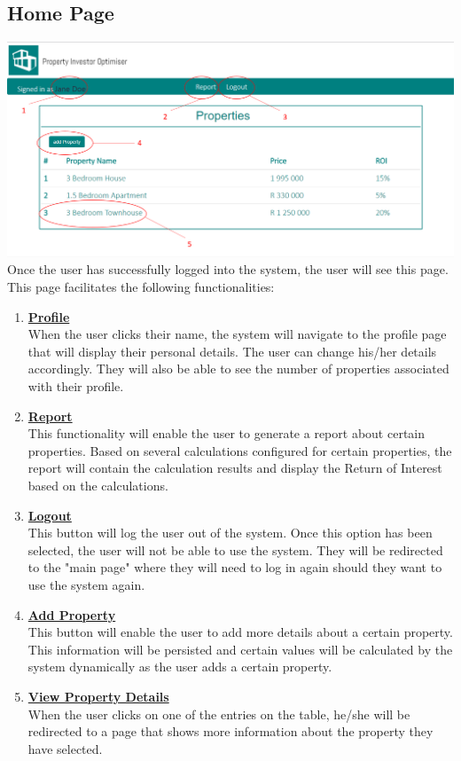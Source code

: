 \documentclass[a4paper,12pt]{article}
\begin{document}
\subsection{Home Page}
		\includegraphics[width=0.9\linewidth, center]{./System/Home.PNG}\\[0.4cm]  
Once the user has successfully logged into the system, the user will see this page. This page facilitates the following functionalities:
	\begin{enumerate}
		\item{\underline{\bfseries Profile}}\\[0.2cm] 
		When the user clicks their name, the system will navigate to the profile page that will display their personal details. 				The user can change his/her details accordingly. They will also be able to see the number of properties associated 				with their profile.
		\bigskip
		\item{\underline{\bfseries Report}}\\[0.2cm] 
		This functionality will enable the user to generate a report about certain properties. Based on several calculations 				configured for certain properties, the report will contain the calculation results and display the Return of Interest based 			on the calculations. 
		\bigskip
		\item{\underline{\bfseries Logout}}\\[0.2cm] 
		This button will log the user out of the system. Once this option has been selected, the user will not be able to use the 				system. They will be redirected to the "main page" where they will need to log in again should they want to use the system 				again. 
		\bigskip
		\item{\underline{\bfseries Add Property}}\\[0.2cm] 
		This button will enable the user to add more details about a certain property. This information will be persisted and 				certain values will be calculated by the system dynamically as the user adds a certain property.
		\bigskip
		\item{\underline{\bfseries View Property Details}}\\[0.2cm] 
		When the user clicks on one of the entries on the table, he/she will be redirected to a page that shows more information 		about the property they have selected.
	\end{enumerate}
\end{document}
